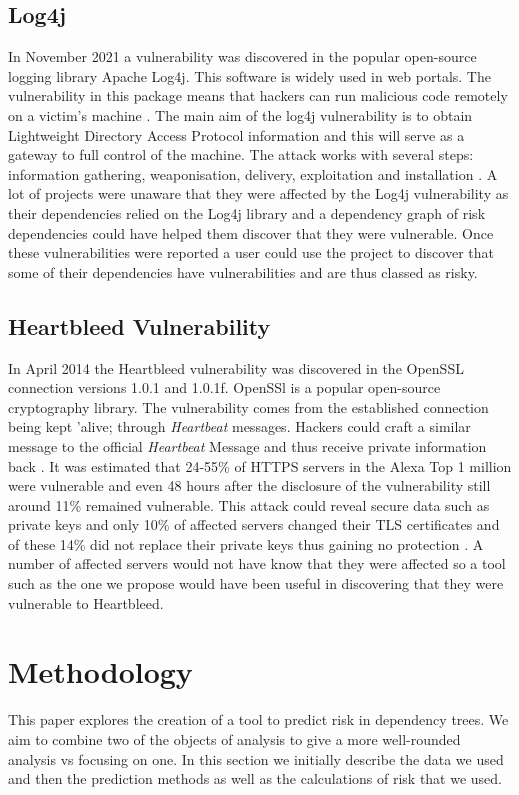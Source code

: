 \documentclass[10pt, compsoc, conference]{IEEEtran}
\begin{document}
\subsection{Log4j}
In November 2021 a vulnerability was discovered in the popular open-source logging library Apache Log4j. This software is widely used in web portals. The vulnerability in this package means that hackers can run malicious code remotely on a victim's machine \cite{h_gupta_identification_2022}. The main aim of the log4j vulnerability is to obtain Lightweight Directory Access Protocol information and this will serve as a gateway to full control of the machine. The attack works with several steps: information gathering, weaponisation, delivery, exploitation and installation \cite{f_maulana_unmasking_2023}. A lot of projects were unaware that they were affected by the Log4j vulnerability as their dependencies relied on the Log4j library and a dependency graph of risk dependencies could have helped them discover that they were vulnerable. Once these vulnerabilities were reported a user could use the project to discover that some of their dependencies have vulnerabilities and are thus classed as risky. 

\subsection{Heartbleed Vulnerability}
In April 2014 the Heartbleed vulnerability was discovered in the OpenSSL connection versions 1.0.1 and 1.0.1f. OpenSSl is a popular open-source cryptography library. The vulnerability comes from the established connection being kept 'alive; through \textit{Heartbeat} messages. Hackers could craft a similar message to the official \textit{Heartbeat} Message and thus receive private information back \cite{s_kyatam_heartbleed_2017}. It was estimated that 24-55\% of HTTPS servers in the Alexa Top 1 million were vulnerable and even 48 hours after the disclosure of the vulnerability still around 11\% remained vulnerable. This attack could reveal secure data such as private keys and only 10\% of affected servers changed their TLS certificates and of these 14\% did not replace their private keys thus gaining no protection \cite{durumeric_matter_2014}. A number of affected servers would not have know that they were affected so a tool such as the one we propose would have been useful in discovering that they were vulnerable to Heartbleed. 

\section{Methodology}
This paper explores the creation of a tool to predict risk in dependency trees. We aim to combine two of the objects of analysis to give a more well-rounded analysis vs focusing on one. In this section we initially describe the data we used and then the prediction methods as well as the calculations of risk that we used. 
\end{document}
